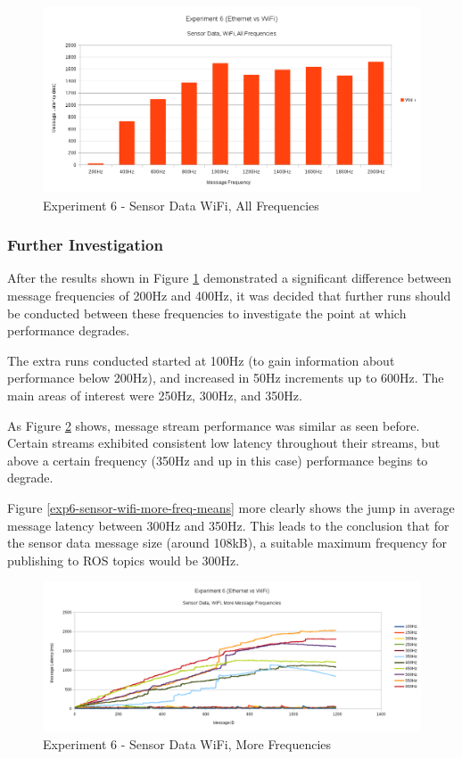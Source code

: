 \documentclass[../dissertation.tex]{subfiles}
\begin{document}
\begin{figure}[H]
\centering
\includegraphics[width=\textwidth]{images/experiment6/sensor_data_wifi_all_freqs_mean.png}
\caption{Experiment 6 - Sensor Data WiFi, All Frequencies}
\label{exp6-sensor-wifi-all-freq-mean}
\end{figure}

\subsubsection{Further Investigation}

After the results shown in Figure \ref{exp6-sensor-wifi-all-freq-mean} demonstrated a significant difference between message frequencies of 200Hz and 400Hz, it was decided that further runs should be conducted between these frequencies to investigate the point at which performance degrades.

The extra runs conducted started at 100Hz (to gain information about performance below 200Hz), and increased in 50Hz increments up to 600Hz. The main areas of interest were 250Hz, 300Hz, and 350Hz.

As Figure \ref{exp6-sensor-wifi-more-freq-stream} shows, message stream performance was similar as seen before. Certain streams exhibited consistent low latency throughout their streams, but above a certain frequency (350Hz and up in this case) performance begins to degrade.

Figure \ref{exp6-sensor-wifi-more-freq-means} more clearly shows the jump in average message latency between 300Hz and 350Hz. This leads to the conclusion that for the sensor data message size (around 108kB), a suitable maximum frequency for publishing to ROS topics would be 300Hz.

\begin{figure}[H]
\centering
\includegraphics[width=\textwidth]{images/experiment6/sensor_data_wifi_more_freqs_stream.png}
\caption{Experiment 6 - Sensor Data WiFi, More Frequencies}
\label{exp6-sensor-wifi-more-freq-stream}
\end{figure}
\end{document}
